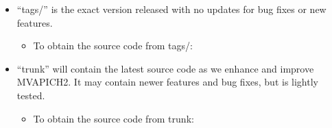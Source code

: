 \begin{itemize}

\item ``tags/\mvapichrcversion'' is the exact version released with no updates 
for bug fixes or new features.

\begin{itemize}
\item To obtain the source code from tags/\mvapichrcversion:


\end{itemize}

\begin{comment}
\item ``branches/\mvapichbranchversion'' is a stable version with bug fixes.  New features are not added to this branch.

\begin{itemize}
\item To obtain the source code from branches/\mvapichbranchversion:

\CommandBox{\$ svn co
https://scm.nowlab.cse.ohio-state.edu/svn/mpi/mvapich2/branches/\mvapichbranchversion \\
mvapich2}{0.9}

\end{itemize}
\end{comment}

\item ``trunk'' will contain the latest source code as we enhance 
and improve MVAPICH2.  It may contain newer
features and bug fixes, but is lightly tested.

\begin{itemize}
\item To obtain the source code from trunk:


\end{itemize}

\begin{comment}
        \item \emph{To follow the exact steps indicated in this user
        guide, dated June 13th, 2008 or later, please download the
        latest source from the 1.5 branch}
\end{comment}
\end{itemize}

